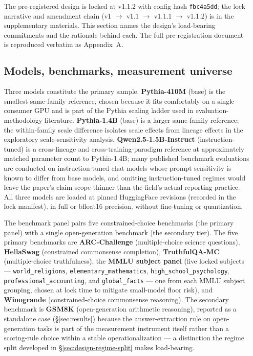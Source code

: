 \documentclass[11pt]{article}
\begin{document}
The pre-registered design is locked at v1.1.2 with config hash
\texttt{fbc4a5dd}; the lock narrative and amendment chain
(v1 \(\to\) v1.1 \(\to\) v1.1.1 \(\to\) v1.1.2) is in the
supplementary materials. This section names the design's
load-bearing commitments and the rationale behind each. The full
pre-registration document is reproduced verbatim as Appendix~A.

\subsection{Models, benchmarks, measurement universe}
\label{sec:design-materials}

Three models constitute the primary sample. \textbf{Pythia-410M}
(base) is the smallest same-family reference, chosen because it
fits comfortably on a single consumer GPU and is part of the
Pythia scaling ladder used in evaluation-methodology literature.
\textbf{Pythia-1.4B} (base) is a larger same-family reference;
the within-family scale difference isolates scale effects from
lineage effects in the exploratory scale-sensitivity analysis.
\textbf{Qwen2.5-1.5B-Instruct} (instruction-tuned) is a
cross-lineage and cross-training-paradigm reference at
approximately matched parameter count to Pythia-1.4B; many
published benchmark evaluations are conducted on instruction-tuned
chat models whose prompt sensitivity is known to differ from base
models, and omitting instruction-tuned regimes would leave the
paper's claim scope thinner than the field's actual reporting
practice. All three models are loaded at pinned HuggingFace
revisions (recorded in the lock manifest), in full or bfloat16
precision, without fine-tuning or quantization.

\begin{sloppypar}
The benchmark panel pairs five constrained-choice benchmarks (the
primary panel) with a single open-generation benchmark (the
secondary tier). The five primary benchmarks are
\textbf{ARC-Challenge} (multiple-choice science questions),
\textbf{HellaSwag} (constrained commonsense completion),
\textbf{TruthfulQA-MC} (multiple-choice truthfulness),
the \textbf{MMLU subject panel} (five locked subjects ---
\texttt{world\_religions}, \texttt{elementary\_mathematics},
\texttt{high\_school\_psychology}, \texttt{professional\_accounting},
and \texttt{global\_facts} --- one from each MMLU subject grouping,
chosen at lock time to mitigate small-model floor risk), and
\textbf{Winogrande} (constrained-choice commonsense reasoning).
The secondary benchmark is \textbf{GSM8K} (open-generation
arithmetic reasoning), reported as a standalone case
(§\ref{sec:results}) because the answer-extraction rule on
open-generation tasks is part of the measurement instrument itself
rather than a scoring-rule choice within a stable operationalization
--- a distinction the regime split developed in
§\ref{sec:design-regime-split} makes load-bearing.
\end{sloppypar}
\end{document}
